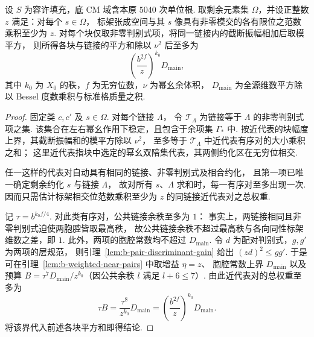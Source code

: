 \begin{lemma}[标架相交位控制同链接平方和]
\label{lem:b-link-meet}
\emitthmsource
设 $S$ 为容许填充，底 CM 域含本原 $5040$ 次单位根.
取剩余元素集 $\Omega$，并设正整数 $z$ 满足：对每个 $s\in\Omega$，
标架张成空间与其 $s$ 像具有非零模交的各有限位之范数乘积至少为 $z$.
对每个块仅取非零判别式项，将同一链接内的截断振幅相加后取模平方，
则所得各块与链接的平方和除以 $\nu^2$ 后至多为
\[
 \left(\frac{b^{2f}}{z}\right)^{k_0}D_{\mathrm{main}},
\]
其中 $k_0$ 为 $X_0$ 的秩，$f$ 为无穷位数，$\nu$ 为幂幺余体积，
$D_{\mathrm{main}}$ 为全源维数平方除以 Bessel 度数乘积与标准格质量之积.
\end{lemma}
\begin{proof}
固定类 $c,c'$ 及 $s\in\Omega$. 对每个链接 $\Lambda$，
令 $\mathcal T_\Lambda$ 为链接等于 $\Lambda$ 的非零判别式项之集.
该集合在左右幂幺作用下稳定，且包含于余项集 $\Gamma_*$ 中.
按近代表的块幅度上界，其截断振幅和的模平方除以 $\nu^2$，
至多等于 $\mathcal T_\Lambda$ 中近代表有序对的大小乘积之和；
这里近代表指块中选定的幂幺双陪集代表，其两侧约化区在无穷位相交.

任一这样的代表对自动具有相同的链接、非零判别式及相合约化，
且第一项已唯一确定剩余约化 $s$ 与链接 $\Lambda$，
故对所有 $s$、$\Lambda$ 求和时，每一有序对至多出现一次.
因而只需估计标架相交位范数乘积至少为 $z$ 的同链接近代表对之总权重.

记 $\tau=b^{k_0 f/4}$. 对此类有序对，公共链接余秩至多为 $1$：
事实上，两链接相同且非零判别式迫使两胞腔皆取最高秩，
故公共链接余秩不超过最高秩与各向同性标架维数之差，即 $1$.
此外，两项的胞腔常数均不超过 $D_{\mathrm{main}}$.
令 $d$ 为配对判别式，$g,g'$ 为两项的层规范，
则引理~\ref{lem:b-pair-discriminant-gain} 给出 $(zd)^2\le gg'$.
于是可在引理~\ref{lem:b-weighted-near-pairs} 中取增益 $\eta=z$、
胞腔常数上界 $D_{\mathrm{main}}$ 以及预算
$B=\tau^7D_{\mathrm{main}}/z^{k_0}$（因公共余秩 $l$ 满足 $l+6\le7$）.
由此近代表对的总权重至多为
\[
 \tau B=\frac{\tau^8}{z^{k_0}}D_{\mathrm{main}}
       =\left(\frac{b^{2f}}{z}\right)^{k_0}D_{\mathrm{main}}.
\]
将该界代入前述各块平方和即得结论.
\end{proof}

